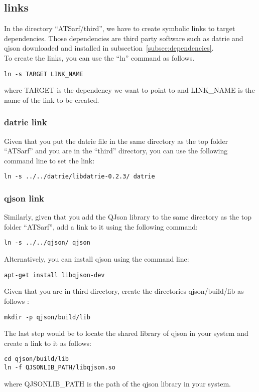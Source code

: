 \documentclass{article}
\begin{document}
\subsection{links}
In the directory ``ATSarf/third'', we have to create symbolic links to target dependencies. Those dependencies are third party software such as datrie and qjson downloaded and installed in subsection~\ref{subsec:dependencies}.\\

To create the links, you can use the ``ln'' command as follows.\\
\begin{verbatim}
ln -s TARGET LINK_NAME
\end{verbatim}
where TARGET is the dependency we want to point to and LINK\_NAME is the name of the link to be created.\\

\subsubsection{datrie link}
Given that you put the datrie file in the same directory as the top folder ``ATSarf'' and you are in the ``third'' directory, you can use the following command line to set the link:
\begin{verbatim}
ln -s ../../datrie/libdatrie-0.2.3/ datrie
\end{verbatim}

\subsubsection{qjson link}
Similarly, given that you add the QJson library to the same directory as the top folder ``ATSarf'', add a link to it using the following command:
\begin{verbatim}
ln -s ../../qjson/ qjson
\end{verbatim}

Alternatively, you can install qjson using the command line:
\begin{verbatim}
apt-get install libqjson-dev
\end{verbatim}

Given that you are in third directory, create the directories qjson/build/lib as follows :
\begin{verbatim}
mkdir -p qjson/build/lib
\end{verbatim}

The last step would be to locate the shared library of qjson in your system and create a link to it as follows:
\begin{verbatim}
cd qjson/build/lib
ln -f QJSONLIB_PATH/libqjson.so
\end{verbatim}
where QJSONLIB\_PATH is the path of the qjson library in your system.\\
\end{document}
